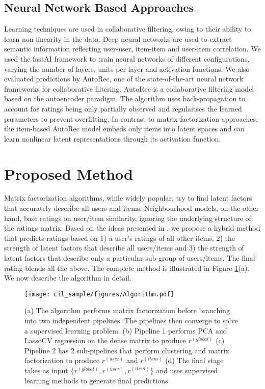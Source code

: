 \documentclass[10pt,conference,compsocconf]{IEEEtran}
\begin{document}
\subsection{Neural Network Based Approaches}
Learning techniques are used in collaborative filtering, owing to their ability to learn non-linearity in the data. Deep neural networks are used to extract semantic information reflecting user-user, item-item and user-item correlation. We used the fastAI \cite{FastAI, FASTAIPaper} framework to train neural networks of different configurations, varying the number of layers, units per layer and activation functions. We also evaluated predictions by AutoRec, one of the state-of-the-art neural network frameworks for collaborative filtering. AutoRec \cite{AutoRec} is a collaborative filtering model based on the autoencoder paradigm. The algorithm uses back-propagation to account for ratings being only partially observed and  regularises the learned parameters to prevent overfitting. In contrast to matrix factorization approaches, the item-based AutoRec model embeds only items into latent spaces and can learn nonlinear latent representations through its activation function.

\section{Proposed Method}\label{sec:proposed_method}
Matrix factorization algorithms, while widely popular, try to find latent factors that accurately describe all users and items. Neighbourhood models, on the other hand, base ratings on user/item similarity, ignoring the underlying structure of the ratings matrix. Based on the ideas presented in \cite{MPMA}, we propose a hybrid method that predicts ratings based on 1) a user's ratings of all other items, 2) the strength of latent factors that describe all users/items and 3) the strength of latent factors that describe only a particular sub-group of users/items. The final rating blends all the above. The complete method is illustrated in Figure \ref{fig:overview}(a). We now describe the algorithm in detail. 


\begin{figure}[t]
  \centering
  \texttt{[image: cil\_sample/figures/Algorithm.pdf]}
  \caption{(a) The algorithm performs matrix factorization before branching into two independent pipelines. The pipelines then converge to solve a supervised learning problem. (b) Pipeline 1 performs PCA and LassoCV regression on the dense matrix to produce $r^{(global)}$ (c) Pipeline 2 has 2 sub-pipelines that perform clustering and matrix factorization to produce $r^{(user)}$ and $r^{(item)}$ (d) The final stage takes as input \{$r^{(global)}, r^{(user)}, r^{(item)}$\} and uses supervised learning methods to generate final predictions}
  \label{fig:overview}
\end{figure}
\end{document}
